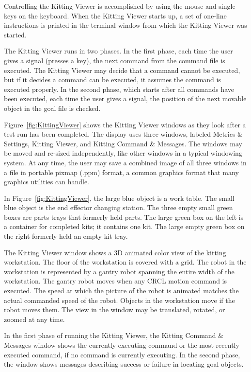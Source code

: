 Controlling the Kitting Viewer is accomplished by using the mouse and single
keys on the keyboard. When the Kitting Viewer starts up, a set of one-line
instructions is printed in the terminal window from which the
Kitting Viewer was started.

The Kitting Viewer runs in two phases. In the first phase, each time the
user gives a signal (presses a key), the next command from the
command file is executed. The Kitting Viewer may decide that a command
cannot be executed, but if it decides a command can be executed, it assumes
the command is executed properly. In the second phase, which starts after
all commands have been executed, each time the user gives a signal, the
position of the next movable object in the goal file is checked.

Figure~\ref{fig:KittingViewer} shows the Kitting Viewer windows as they
look after a test run has been completed. The display uses three windows,
labeled Metrics \& Settings, Kitting Viewer, and Kitting Command \&
Messages. The windows may be moved and re-sized independently, like other
windows in a typical windowing system. At any time, the user may save a
combined image of all three windows in a file in portable pixmap (.ppm)
format, a common graphics format that many graphics utilities can handle.

In Figure~\ref{fig:KittingViewer}, the large blue object is a work table.
The small blue object is the end effector changing station. The three empty
small green boxes are parts trays that formerly held parts. The large green
box on the left is a container for completed kits; it contains one kit. The
large empty green box on the right formerly held an empty kit tray.

The Kitting Viewer window shows a 3D animated color view of the kitting
workstation. The floor of the workstation is covered with a grid. The robot
in the workstation is represented by a gantry robot spanning the entire
width of the workstation. The gantry robot moves when any CRCL motion
command is executed. The speed at which the picture of the robot is
animated matches the actual commanded speed of the robot. Objects in the
workstation move if the robot moves them. The view in the window may be
translated, rotated, or zoomed at any time.

In the first phase of running the Kitting Viewer, the Kitting Command \&
Messages window shows the currently executing command or the most recently
executed command, if no command is currently executing. In the second
phase, the window shows messages describing success or failure in locating
goal objects.

